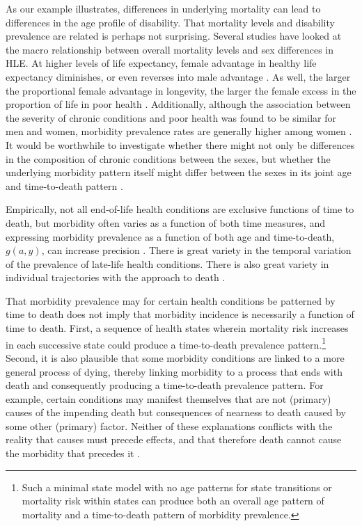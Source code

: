 \documentclass[11pt,oneside,a4paper]{article} %
\begin{document}
As our example illustrates, differences
in underlying mortality can lead to differences in the age profile of
disability. That mortality levels and disability prevalence
are related is perhaps not surprising. Several studies have looked at the macro relationship between overall mortality
levels and sex differences in HLE. At higher levels of life expectancy, female
advantage in healthy life expectancy diminishes, or even reverses into male
advantage \citep{vanOyen2013}. As well, the larger the proportional female
advantage in longevity, the larger the female excess in the proportion of life
in poor health \citep{Luy2014}. 
Additionally, although the association between the severity of chronic conditions and poor health was found
to be similar for men and women, morbidity prevalence rates are generally higher
among women \citep{Case2005}. It
would be worthwhile to investigate whether there might not only be differences
in the composition of chronic conditions between the sexes, but whether the
underlying morbidity pattern itself might differ between the sexes in its joint
age and time-to-death pattern \citep{riffe2015ttd}.

Empirically, not all end-of-life health conditions are exclusive functions of
time to death, but morbidity often varies as a function of
both time measures, and expressing morbidity prevalence
as a function of both age and time-to-death, $g(a,y)$, can increase precision
\citep{wolf2015disability,riffe2015ttd}.
There is great variety in the temporal variation of the prevalence of late-life
health conditions. There is also great variety in individual trajectories with
the approach to death \citep{lunney2003patterns}. 

That morbidity prevalence may for certain health conditions be patterned by
time to death does not imply that morbidity incidence is necessarily a function
of time to death. First, a sequence of health states wherein
mortality risk increases in each successive state could produce a time-to-death
prevalence pattern.\footnote{Such a minimal state model with no age patterns for state transitions or mortality risk within states can produce both an overall age pattern of mortality and a time-to-death pattern of morbidity prevalence.} Second, it is also
plausible that some morbidity conditions are linked to a more general process of dying, thereby
linking morbidity to a process that ends with death and consequently producing a
time-to-death prevalence pattern. For example, certain conditions may manifest
themselves that are not (primary) causes of the impending death but
consequences of nearness to death caused by some other (primary) factor.
Neither of these explanations conflicts with the reality that causes must
precede effects, and that therefore death cannot cause the morbidity that precedes it \citep{lynch2015commentary}.
\end{document}
